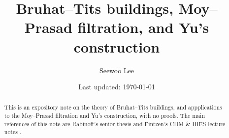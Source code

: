 \documentclass[letterpaper, 12pt]{article}
\begin{document}

\title{Bruhat--Tits buildings, Moy--Prasad filtration, and Yu's construction}


\author{Seewoo Lee}
\date{\normalsize\vspace{-1ex} Last updated: \today}


\maketitle



\begin{abstract}
This is an expository note on the theory of Bruhat--Tits buildings, and appplications to the Moy--Prasad filtration and Yu's construction, with no proofs.
The main references of this note are Rabinoff's senior thesis \cite{rabinoff2003bruhat} and Fintzen's CDM \& IHES lecture notes \cite{fintzen2021representations,fintzensupercuspidal}.
\end{abstract}






\newpage




{
\footnotesize
}







\end{document}
